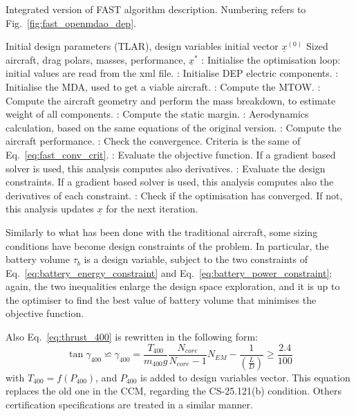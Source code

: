 \begin{algorithm}[!h]
	\caption{Integrated version of FAST algorithm description. Numbering refers to Fig.~\ref{fig:fast_openmdao_dep}.}
	\label{alg:fast_openmdao_dep}
	\begin{algorithmic}
		\REQUIRE Initial design parameters (TLAR), design variables initial vector $\underline{x}^{(0)}$
		\ENSURE Sized aircraft, drag polars, masses, performance, $\underline{x}^*$
		: Initialise the optimisation loop: initial values are read from the xml file.
		\REPEAT
		: Initialise DEP electric components. 
		: Initialise the MDA, used to get a viable aircraft.
		\REPEAT
		: Compute the MTOW.
		: Compute the aircraft geometry and perform the mass breakdown, to estimate weight of all components.
		: Compute the static margin.
		: Aerodynamics calculation, based on the same equations of the original version.
		: Compute the aircraft performance.
		: Check the convergence. 
		Criteria is the same of Eq.~\eqref{eq:fast_conv_crit}.
		: Evaluate the objective function.
		 If a gradient based solver is used, this analysis computes also derivatives.
		: Evaluate the design constraints.
		If a gradient based solver is used, this analysis computes also the derivatives of each constraint.
		: Check if the optimisation has converged. If not, this analysis updates $\underline{x}$ for the next iteration.
	\end{algorithmic}
\end{algorithm}

Similarly to what has been done with the traditional aircraft, some sizing conditions have become design constraints of the problem. 
In particular, the battery volume $\tau_{b}$ is a design variable, subject to the two constraints of Eq.~\eqref{eq:battery_energy_constraint} and Eq.~\eqref{eq:battery_power_constraint}; again, the two inequalities enlarge the design space exploration, and it is up to the optimiser to find the best value of battery volume that minimises the objective function. 

Also Eq.~\eqref{eq:thrust_400} is rewritten in the following form:
\begin{equation}
	\label{eq:gamma_400_constraint}
	\tan\gamma_{400} \backsimeq \gamma_{400} = \frac{T_{400}}{m_{400}g}\frac{N_{core}}{N_{core}-1}N_{EM} - \frac{1}{\left(\frac{L}{D}\right)} \geq \frac{2.4}{100}
\end{equation}
with $T_{400}=f\left(P_{400}\right)$, and $P_{400}$ is added to design variables vector. 
This equation replaces the old one in the CCM, regarding the CS-25.121(b) condition.
Others certification specifications are treated in a similar manner. 

